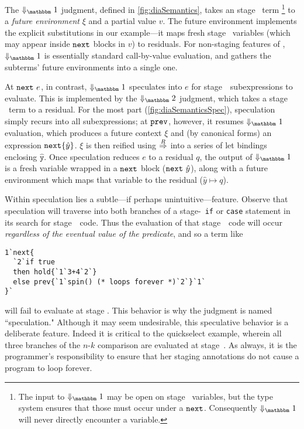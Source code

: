 
The $\redonesym$ judgment, defined in \ref{fig:diaSemantics}, takes an stage
\bbone\ term%
\footnote{ The input to $\redonesym$ may be open on stage \bbtwo\ variables, but
the type system ensures that those must occur under a ${\tt next}$. Consequently
$\redonesym$ will never directly encounter a variable.}
%
to a {\em future environment} $\xi$ and a partial value $v$. The future
environment implements the explicit substitutions in our example---it maps fresh
stage \bbtwo\ variables (which may appear inside ${\tt next}$ blocks in $v$) to
residuals. For non-staging features of \lang, $\redonesym$ is essentially
standard call-by-value evaluation, and gathers the subterms' future environments
into a single one.


At ${\tt next}~e$, in contrast, $\redonesym$ speculates into $e$ for stage~\bbone\ 
subexpressions to evaluate.  This is implemented by the $\redtwosym$ judgment,
which takes a stage \bbtwo\ term to a residual. 
For the most part (\ref{fig:diaSemanticsSpec}), speculation simply recurs into
all subexpressions; at ${\tt prev}$, however, it resumes $\redonesym$ evaluation,
which produces a future context $\xi$ and (by canonical forms) an expression
${\tt next}\{\hat y\}$. $\xi$ is then reified using $\overset{R}\Rightarrow$ into a series of let
bindings enclosing $\mathtt{\hat y}$.
Once speculation reduces $e$ to a residual $q$, the output of $\redonesym$ is a
fresh variable wrapped in a ${\tt next}$ block (${\tt next}~\hat y$), along with a future
environment which maps that variable to the residual ($\hat y \mapsto q$).

Within speculation lies a subtle---if perhaps unintuitive---feature.  
Observe that speculation will traverse into both branches of a stage-\bbtwo\ {\tt if} or {\tt case} 
statement in its search for stage~\bbone\ code. 
Thus the evaluation of that stage~\bbone\ code will occur {\em regardless of the eventual value of the predicate},
and so a term like 
\begin{lstlisting} 
1`next{
  `2`if true 
  then hold{`1`3+4`2`} 
  else prev{`1`spin() (* loops forever *)`2`}`1`
}`
\end{lstlisting}
will fail to evaluate at stage \bbone.
This behavior is why the judgment is named ``speculation."
Although it may seem undesirable, this speculative behavior is a deliberate feature.
Indeed it is critical to the quickselect example, 
wherein all three branches of the $n$-$k$ comparison are evaluated at stage~\bbone.
As always, it is the programmer's responsibility to ensure that her staging annotations 
do not cause a program to loop forever.  

